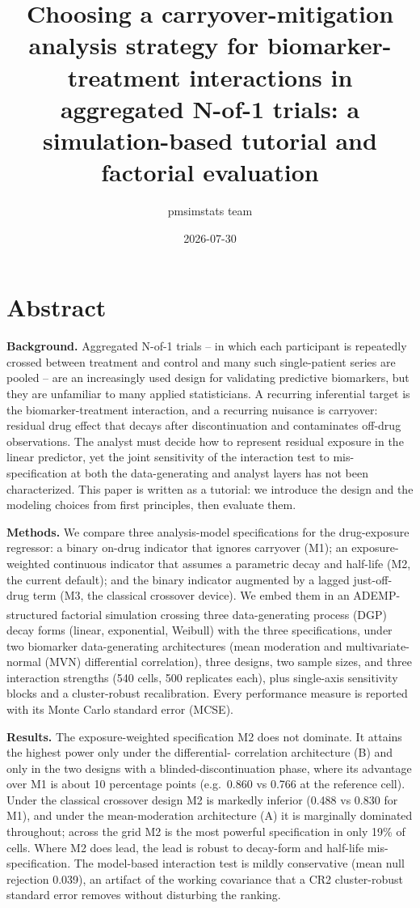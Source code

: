 \documentclass[
  11pt,
]{article}
\title{Choosing a carryover-mitigation analysis strategy for biomarker-treatment interactions in aggregated N-of-1 trials: a simulation-based tutorial and factorial evaluation}
\author{pmsimstats team}
\date{2026-07-30}
\begin{document}
\maketitle

\section*{Abstract}\label{abstract}

\textbf{Background.} Aggregated N-of-1 trials -- in which each
participant is repeatedly crossed between treatment and control and
many such single-patient series are pooled -- are an increasingly
used design for validating predictive biomarkers, but they are
unfamiliar to many applied statisticians. A recurring inferential
target is the biomarker-treatment interaction, and a recurring
nuisance is carryover: residual drug effect that decays after
discontinuation and contaminates off-drug observations. The analyst
must decide how to represent residual exposure in the linear
predictor, yet the joint sensitivity of the interaction test to
mis-specification at both the data-generating and analyst layers
has not been characterized. This paper is written as a tutorial:
we introduce the design and the modeling choices from first
principles, then evaluate them.

\textbf{Methods.} We compare three analysis-model specifications for the
drug-exposure regressor: a binary on-drug indicator that ignores
carryover (M1); an exposure-weighted continuous indicator that
assumes a parametric decay and half-life (M2, the current default);
and the binary indicator augmented by a lagged just-off-drug term
(M3, the classical crossover device). We embed them in an
ADEMP-structured factorial simulation\textsuperscript{}
crossing three data-generating process (DGP) decay forms (linear,
exponential, Weibull) with the three specifications, under two
biomarker data-generating architectures (mean moderation and
multivariate-normal (MVN) differential correlation), three designs, two
sample sizes, and three interaction strengths (540 cells, 500
replicates each), plus single-axis sensitivity blocks and a
cluster-robust recalibration. Every performance measure is reported
with its Monte Carlo standard error (MCSE).

\textbf{Results.} The exposure-weighted specification M2 does not
dominate. It attains the highest power only under the differential-
correlation architecture (B) and only in the two designs with a
blinded-discontinuation phase, where its advantage over M1 is about
10 percentage points (e.g.~0.860 vs 0.766 at the reference cell).
Under the classical crossover design M2 is markedly inferior (0.488
vs 0.830 for M1), and under the mean-moderation architecture (A) it
is marginally dominated throughout; across the grid M2 is the
most powerful specification in only 19\% of cells. Where M2 does
lead, the lead is robust to decay-form and half-life
mis-specification. The model-based interaction test is mildly
conservative (mean null rejection 0.039), an artifact of the
working covariance that a CR2 cluster-robust standard error removes
without disturbing the ranking.
\end{document}

